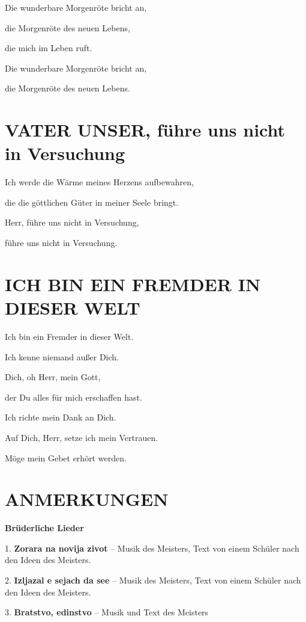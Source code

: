 \documentclass[11pt,a5paper,twoside]{article}
\begin{document}
Die wunderbare Morgenröte bricht an,

die Morgenröte des neuen Lebens,

die mich im Leben ruft.

Die wunderbare Morgenröte bricht an,

die Morgenröte des neuen Lebens.

\section[Vater unser]{VATER UNSER,  führe uns nicht in Versuchung}

Ich werde die Wärme meines Herzens aufbewahren,

die die göttlichen Güter in meiner Seele bringt.

Herr, führe uns nicht in Versuchung,

führe uns nicht in Versuchung.

\section[Ich bin ein Fremder in dieser Welt]{ICH BIN EIN FREMDER IN DIESER WELT}


Ich bin ein Fremder in dieser Welt.

Ich kenne niemand außer Dich. 

Dich, oh Herr, mein Gott,

der Du alles für mich erschaffen hast. 

Ich richte mein Dank an Dich. 

Auf Dich, Herr, setze ich mein Vertrauen.

Möge mein Gebet erhört werden.

\newpage

\section[Anmerkungen]{ANMERKUNGEN}

\begin{center}
\textbf{Brüderliche Lieder}
\end{center}


1. \textbf{Zorara na novija zivot} -- Musik des Meisters, Text von einem Schüler nach den Ideen des Meisters.

2. \textbf{Izljazal e sejach da see} -- Musik des Meisters, Text von einem Schüler nach den Ideen des Meisters.

3. \textbf{Bratstvo, edinstvo} -- Musik und Text des Meisters
\end{document}
